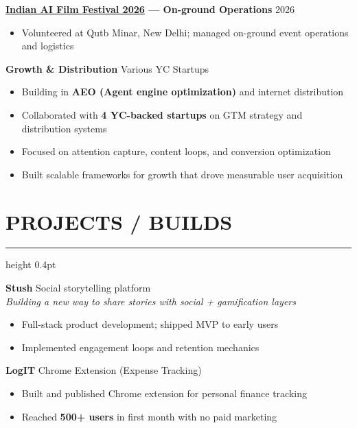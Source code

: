 \documentclass[11pt]{article}
\newcommand{\sectionheader}[1]{%
    \section*{#1}
    \vspace{-4pt}
    \hrule height 0.4pt
    \vspace{6pt}
}
\begin{document}
\noindent\textbf{\href{https://www.mumbaifilmfestival.ai/}{Indian AI Film Festival 2026} --- On-ground Operations} \tabto{8cm} 2026 \\
\begin{itemize}
    \item Volunteered at Qutb Minar, New Delhi; managed on-ground event operations and logistics
\end{itemize}
\vspace{6pt}

\noindent\textbf{Growth \& Distribution} \tabto{8cm} Various YC Startups \newline
\begin{itemize}
    \item Building in \textbf{AEO (Agent engine optimization)} and internet distribution
    \item Collaborated with \textbf{4 YC-backed startups} on GTM strategy and distribution systems
    \item Focused on attention capture, content loops, and conversion optimization
    \item Built scalable frameworks for growth that drove measurable user acquisition
\end{itemize}
\vspace{8pt}

\sectionheader{PROJECTS / BUILDS}

\noindent\textbf{Stush} \tabto{8cm} Social storytelling platform \\
\textit{Building a new way to share stories with social + gamification layers} \newline
\begin{itemize}
    \item Full-stack product development; shipped MVP to early users
    \item Implemented engagement loops and retention mechanics
\end{itemize}
\vspace{4pt}

\noindent\textbf{LogIT} \tabto{8cm} Chrome Extension (Expense Tracking) \\
\begin{itemize}
    \item Built and published Chrome extension for personal finance tracking
    \item Reached \textbf{500+ users} in first month with no paid marketing
\end{itemize}
\vspace{4pt}
\end{document}

